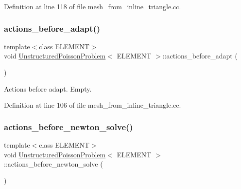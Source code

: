 Definition at line 118 of file mesh\+\_\+from\+\_\+inline\+\_\+triangle.\+cc.

\mbox{\label{classUnstructuredPoissonProblem_ac9627efd3c311156e5347ed37d4ea4b0}} 
\subsubsection{\texorpdfstring{actions\+\_\+before\+\_\+adapt()}{actions\_before\_adapt()}}
{\footnotesize\ttfamily template$<$class E\+L\+E\+M\+E\+NT$>$ \\
void \hyperlink{classUnstructuredPoissonProblem}{Unstructured\+Poisson\+Problem}$<$ E\+L\+E\+M\+E\+NT $>$\+::actions\+\_\+before\+\_\+adapt (\begin{DoxyParamCaption}{ }\end{DoxyParamCaption})\hspace{0.3cm}{\ttfamily [inline]}}



Actions before adapt. Empty. 



Definition at line 106 of file mesh\+\_\+from\+\_\+inline\+\_\+triangle.\+cc.

\mbox{\label{classUnstructuredPoissonProblem_a2ab9d23c0e6e6631ffe1a761f6bdf026}} 
\subsubsection{\texorpdfstring{actions\+\_\+before\+\_\+newton\+\_\+solve()}{actions\_before\_newton\_solve()}\hspace{0.1cm}{\footnotesize\ttfamily [1/2]}}
{\footnotesize\ttfamily template$<$class E\+L\+E\+M\+E\+NT$>$ \\
void \hyperlink{classUnstructuredPoissonProblem}{Unstructured\+Poisson\+Problem}$<$ E\+L\+E\+M\+E\+NT $>$\+::actions\+\_\+before\+\_\+newton\+\_\+solve (\begin{DoxyParamCaption}{ }\end{DoxyParamCaption})\hspace{0.3cm}{\ttfamily [inline]}}



